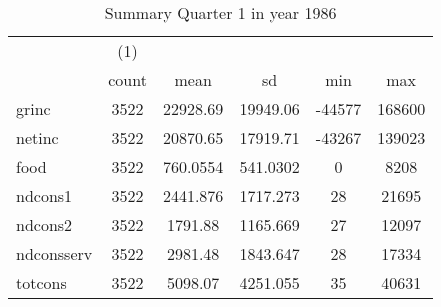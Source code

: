\begin{table}[htbp]\centering
\def\sym#1{\ifmmode^{#1}\else\(^{#1}\)\fi}
\caption{Summary Quarter 1 in year 1986 \label{sum\_Q1\_y1986}}
\begin{tabular}{l*{1}{ccccc}}
\hline\hline
            &\multicolumn{1}{c}{(1)}&            &            &            &            \\
            &       count&        mean&          sd&         min&         max\\
\hline
grinc       &        3522&    22928.69&    19949.06&      -44577&      168600\\
netinc      &        3522&    20870.65&    17919.71&      -43267&      139023\\
food        &        3522&    760.0554&    541.0302&           0&        8208\\
ndcons1     &        3522&    2441.876&    1717.273&          28&       21695\\
ndcons2     &        3522&     1791.88&    1165.669&          27&       12097\\
ndconsserv  &        3522&     2981.48&    1843.647&          28&       17334\\
totcons     &        3522&     5098.07&    4251.055&          35&       40631\\
\hline\hline
\end{tabular}
\end{table}
